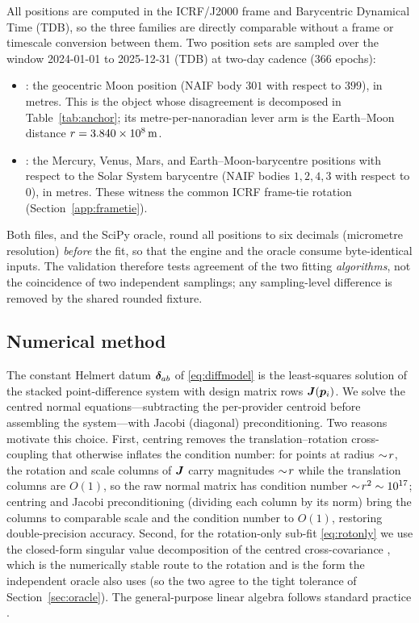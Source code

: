 All positions are computed in the ICRF/J2000 frame and Barycentric Dynamical Time
(TDB), so the three families are directly comparable without a frame or timescale
conversion between them. Two position sets are sampled over the window 2024-01-01 to
2025-12-31 (TDB) at two-day cadence ($366$ epochs):
\begin{itemize}
  \item {}: the geocentric Moon position (NAIF body $301$ with
  respect to $399$), in metres. This is the object whose disagreement is decomposed
  in Table~\ref{tab:anchor}; its metre-per-nanoradian lever arm is the Earth--Moon
  distance $r=\SI{3.840e8}{m}$.
  \item {}: the Mercury, Venus, Mars, and Earth--Moon-barycentre
  positions with respect to the Solar System barycentre (NAIF bodies $1,2,4,3$ with
  respect to $0$), in metres. These witness the common ICRF frame-tie rotation
  (Section~\ref{app:frametie}).
\end{itemize}
Both files, and the SciPy oracle, round all positions to six decimals (micrometre
resolution) \emph{before} the fit, so that the engine and the oracle consume
byte-identical inputs. The validation therefore tests agreement of the two fitting
\emph{algorithms}, not the coincidence of two independent samplings; any
sampling-level difference is removed by the shared rounded fixture.

\subsection{Numerical method}
\label{app:numerics}

The constant Helmert datum $\bm{\delta}_{ab}$ of \eqref{eq:diffmodel} is the least-squares
solution of the stacked point-difference system with design matrix rows
$\bm{J}(\bm{p}_i)$. We solve the centred normal equations---subtracting the per-provider
centroid before assembling the system---with Jacobi (diagonal) preconditioning. Two
reasons motivate this choice. First, centring removes the translation--rotation
cross-coupling that otherwise inflates the condition number: for points at radius
$\sim\!r$, the rotation and scale columns of $\bm{J}$ carry magnitudes
$\sim\!r$ while the translation columns are $O(1)$, so the raw normal matrix has
condition number $\sim\!r^2\sim10^{17}$; centring and Jacobi preconditioning
(dividing each column by its norm) bring the columns to comparable scale and the
condition number to $O(1)$, restoring double-precision accuracy. Second, for the
rotation-only sub-fit \eqref{eq:rotonly} we use the closed-form singular value
decomposition of the centred cross-covariance \citep{arun1987leastsquares}, which is
the numerically stable route to the rotation and is the form the independent oracle
also uses (so the two agree to the tight tolerance of Section~\ref{sec:oracle}). The
general-purpose linear algebra follows standard practice
\citep{golub2013matrix}.

